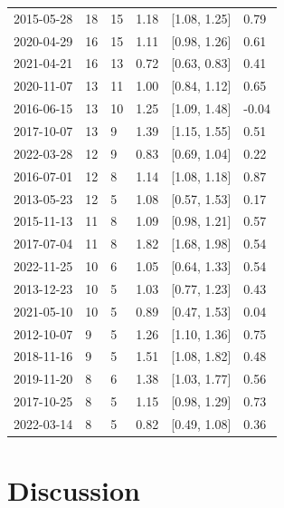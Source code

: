 \documentclass[preprint,12pt,authoryear]{elsarticle}
\begin{document}
\begin{table}[]
\begin{tabular}{lll|lll}
2015-05-28 & 18 & 15 & 1.18 & [1.08, 1.25] & 0.79 \\
2020-04-29 & 16 & 15 & 1.11 & [0.98, 1.26] & 0.61 \\
2021-04-21 & 16 & 13 & 0.72 & [0.63, 0.83] & 0.41 \\
2020-11-07 & 13 & 11 & 1.00 & [0.84, 1.12] & 0.65 \\
2016-06-15 & 13 & 10 & 1.25 & [1.09, 1.48] & -0.04 \\
2017-10-07 & 13 & 9 & 1.39 & [1.15, 1.55] & 0.51 \\
2022-03-28 & 12 & 9 & 0.83 & [0.69, 1.04] & 0.22 \\
2016-07-01 & 12 & 8 & 1.14 & [1.08, 1.18] & 0.87 \\
2013-05-23 & 12 & 5 & 1.08 & [0.57, 1.53] & 0.17 \\
2015-11-13 & 11 & 8 & 1.09 & [0.98, 1.21] & 0.57 \\
2017-07-04 & 11 & 8 & 1.82 & [1.68, 1.98] & 0.54 \\
2022-11-25 & 10 & 6 & 1.05 & [0.64, 1.33] & 0.54 \\
2013-12-23 & 10 & 5 & 1.03 & [0.77, 1.23] & 0.43 \\
2021-05-10 & 10 & 5 & 0.89 & [0.47, 1.53] & 0.04 \\
2012-10-07 & 9 & 5 & 1.26 & [1.10, 1.36] & 0.75 \\
2018-11-16 & 9 & 5 & 1.51 & [1.08, 1.82] & 0.48 \\
2019-11-20 & 8 & 6 & 1.38 & [1.03, 1.77] & 0.56 \\
2017-10-25 & 8 & 5 & 1.15 & [0.98, 1.29] & 0.73 \\
2022-03-14 & 8 & 5 & 0.82 & [0.49, 1.08] & 0.36 \\
\hline
\end{tabular}
    \label{tab:closures}
\end{table}


\section{Discussion}
\end{document}
